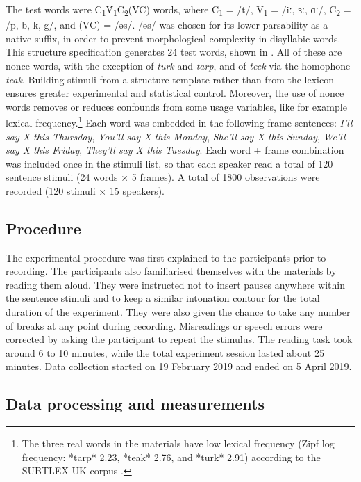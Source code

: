 \documentclass[
  12pt,
  a4paper,
]{article}
\begin{document}
The test words were
C\textsubscript{1}V́\textsubscript{1}C\textsubscript{2}(VC) words, where
C\textsubscript{1} = /t/, V\textsubscript{1} = /iː, ɜː, ɑː/,
C\textsubscript{2} = /p, b, k, g/, and (VC) = /əs/. /əs/ was chosen for
its lower parsability as a native suffix, in order to prevent
morphological complexity in disyllabic words. This structure
specification generates 24 test words, shown in . All of
these are nonce words, with the exception of \emph{turk} and
\emph{tarp}, and of \emph{teek} via the homophone \emph{teak}. Building
stimuli from a structure template rather than from the lexicon ensures
greater experimental and statistical control. Moreover, the use of nonce
words removes or reduces confounds from some usage variables, like for
example lexical
frequency.\footnote{The three real words in the materials have low lexical frequency (Zipf log frequency: *tarp* 2.23, *teak* 2.76, and *turk* 2.91) according to the SUBTLEX-UK corpus \citep{van-heuven2014}.}
Each word was embedded in the following frame sentences: \emph{I'll say
X this Thursday}, \emph{You'll say X this Monday}, \emph{She'll say X
this Sunday}, \emph{We'll say X this Friday}, \emph{They'll say X this
Tuesday}. Each word + frame combination was included once in the stimuli
list, so that each speaker read a total of 120 sentence stimuli (24
words × 5 frames). A total of 1800 observations were recorded (120
stimuli × 15 speakers).

\hypertarget{procedure}{%
\subsection{Procedure}\label{procedure}}

The experimental procedure was first explained to the participants prior
to recording. The participants also familiarised themselves with the
materials by reading them aloud. They were instructed not to insert
pauses anywhere within the sentence stimuli and to keep a similar
intonation contour for the total duration of the experiment. They were
also given the chance to take any number of breaks at any point during
recording. Misreadings or speech errors were corrected by asking the
participant to repeat the stimulus. The reading task took around 6 to 10
minutes, while the total experiment session lasted about 25 minutes.
Data collection started on 19 February 2019 and ended on 5 April 2019.

\hypertarget{data-processing-and-measurements}{%
\subsection{Data processing and
measurements}\label{data-processing-and-measurements}}
\end{document}
